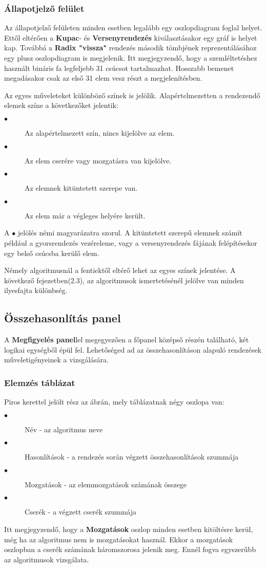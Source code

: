 \documentclass{elteikthesis}
\begin{document}
\subsubsection{Állapotjelző felület}
Az állapotjelző felületen minden esetben legalább egy oszlopdiagram foglal helyet. Ettől eltérően a \textbf{Kupac}- és \textbf{Versenyrendezés} kiválasztásakor egy gráf is helyet kap. Továbbá a \textbf{Radix "vissza"} rendezés második tömbjének reprezentálásához egy plusz oszlopdiagram is megjelenik. Itt megjegyzendő, hogy a szemléltetéshez használt bináris fa legfeljebb 31 csúcsot tartalmazhat. Hosszabb bemenet megadásakor csak az első 31 elem vesz részt a megjelenítésben.
\par Az egyes műveleteket különböző színek is jelölik. Alapértelmezetten a rendezendő elemek színe a következőket jelentik:\par
\begin{description}
	\item[\textcolor{default}{\Huge$\bullet$}] Az alapértelmezett szín, nincs kijelölve az elem.
	\item[\textcolor{swap}{\Huge$\bullet$}] Az elem cserére vagy mozgatásra van kijelölve.
	\item[\textcolor{select}{\Huge$\bullet$}] Az elemnek kitüntetett szerepe van.
	\item[\textcolor{done}{\Huge$\bullet$}] Az elem már a végleges helyére került.
\end{description}
A \textcolor{select}{\Huge$\bullet$} jelölés némi magyarázatra szorul. A kitüntetett szerepű elemnek számít például a gyorsrendezés vezéreleme, vagy a versenyrendezés fájának felépítésekor egy belső csúcsba kerülő elem.\par
Némely algoritmusnál a fentiektől eltérő lehet az egyes színek jelentése. A következő fejezetben(2.3), az algoritmusok ismertetésénél jelölve van minden ilyesfajta különbség.
\subsection{Összehasonlítás panel}
A \textbf{Megfigyelés panel}lel megegyezően a főpanel középső részén található, két logikai egységből épül fel. Lehetőséged ad az összehasonlításon alapuló rendezések műveletigényeinek a vizsgálására.
\subsubsection{Elemzés táblázat}
Piros kerettel jelölt rész az ábrán, mely táblázatnak négy oszlopa van:
\begin{description}
	\item[$\bullet$] Név - az algoritmus neve
	\item[$\bullet$] Hasonlítások - a rendezés során végzett összehasonlítások szummája
	\item[$\bullet$] Mozgatások - az elemmozgatások számának összege
	\item[$\bullet$] Cserék - a végzett cserék szummája
\end{description}
Itt megjegyzendő, hogy a \textbf{Mozgatások} oszlop minden esetben kitöltésre kerül, még ha az algoritmus nem is mozgatásokat használ. Ekkor a mozgatások oszlopban a cserék számának háromszorosa jelenik meg. Ennél fogva egyszerűbb az algoritmusok vizsgálata.
\end{document}
